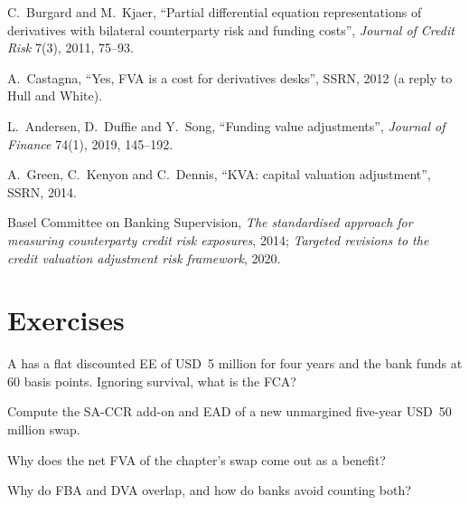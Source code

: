 \begin{omsources}
\item C.\ Burgard and M.\ Kjaer, ``Partial differential equation representations of
derivatives with bilateral counterparty risk and funding costs'', \emph{Journal of Credit
Risk} 7(3), 2011, 75--93.
\item A.\ Castagna, ``Yes, FVA is a cost for derivatives desks'', SSRN, 2012 (a reply to Hull
and White).
\item L.\ Andersen, D.\ Duffie and Y.\ Song, ``Funding value adjustments'', \emph{Journal of
Finance} 74(1), 2019, 145--192.
\item A.\ Green, C.\ Kenyon and C.\ Dennis, ``KVA: capital valuation adjustment'', SSRN, 2014.
\item Basel Committee on Banking Supervision, \emph{The standardised approach for measuring
counterparty credit risk exposures}, 2014; \emph{Targeted revisions to the credit valuation
adjustment risk framework}, 2020.
\end{omsources}

\section{Exercises}

\begin{exercise}[$\star$]\label{exo:rc:funding-margin-and-capital-adjustments:1}
A  has a flat discounted EE of USD~5 million for four years and the bank funds at
60 basis points. Ignoring survival, what is the FCA?
\end{exercise}

\begin{exercise}[$\star$]\label{exo:rc:funding-margin-and-capital-adjustments:2}
Compute the SA-CCR add-on and EAD of a new unmargined five-year USD~50 million swap.
\end{exercise}

\begin{exercise}[$\star$]\label{exo:rc:funding-margin-and-capital-adjustments:3}
Why does the net FVA of the chapter's swap come out as a benefit?
\end{exercise}

\begin{exercise}[$\star\star$]\label{exo:rc:funding-margin-and-capital-adjustments:4}
Why do FBA and DVA overlap, and how do banks avoid counting both?
\end{exercise}

